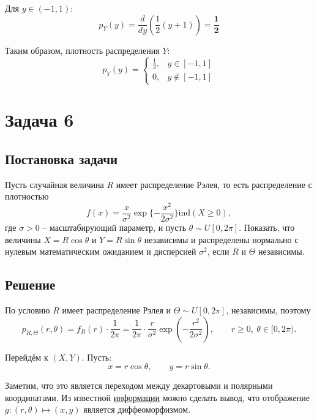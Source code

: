 \documentclass[a4paper,14pt]{extarticle}
\begin{document}
            Для $y \in (-1, 1)$:
            $$
            p_Y(y) = \frac{d}{dy} \left( \frac{1}{2}(y + 1) \right) = \mathbf{\frac{1}{2}}
            $$
            
            Таким образом, плотность распределения $Y$:
            $$
            \boxed{p_Y(y) = \begin{cases}
                                \frac{1}{2}, & y \in [-1, 1] \\
                                0, & y \notin [-1, 1]
            \end{cases}}
            $$
            
    
    
    \section*{Задача 6}
        
        \subsection*{Постановка задачи}
            Пусть случайная величина $R$ имеет распределение Рэлея, то есть распределение с плотностью
            \[f(x) = \frac{x}{\sigma^2} \exp \{- \frac{x^2}{2\sigma^2}\} \mathrm{ind}(X \ge 0),\]
            где $\sigma > 0$ -- масштабирующий параметр, и пусть $\theta \sim  U[0, 2\pi]$.
            Показать, что величины $X = R\cos\theta$ и $Y = R\sin\theta$ независимы и распределены нормально с нулевым математическим ожиданием и дисперсией $\sigma^2$, если $R$ и $\Theta$ независимы.
        
        \subsection*{Решение}
            
            По условию \(R\) имеет распределение Рэлея и \(\Theta\sim U[0,2\pi]\), независимы, поэтому
            \[
                p_{R,\Theta}(r,\theta) = f_R(r) \cdot \frac{1}{2\pi}
                = \frac{1}{2\pi} \cdot \frac{r}{\sigma^2} \exp\left(-\frac{r^2}{2\sigma^2}\right),
                \qquad r \ge 0, \ \theta \in [0, 2\pi).
            \]
            
            Перейдём к $(X,Y)$. Пусть:
            \[
                x = r\cos\theta, \qquad y = r\sin\theta.
            \]
            
            Заметим, что это является переходом между декартовыми и полярными координатами. Из известной \href{https://ru.wikipedia.org/wiki/%D0%9F%D0%BE%D0%BB%D1%8F%D1%80%D0%BD%D0%B0%D1%8F_%D1%81%D0%B8%D1%81%D1%82%D0%B5%D0%BC%D0%B0_%D0%BA%D0%BE%D0%BE%D1%80%D0%B4%D0%B8%D0%BD%D0%B0%D1%82#%D0%AF%D0%BA%D0%BE%D0%B1%D0%B8%D0%B0%D0%BD%D1%8B}{информации} можно сделать вывод, что отображение $g: (r,\theta) \mapsto (x,y)$ является диффеоморфизмом.
            
\end{document}
